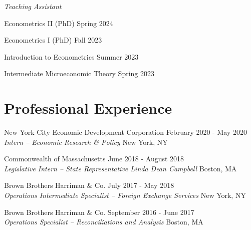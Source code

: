 \documentclass[letterpaper]{article}
\renewenvironment{itemize}{
  \begin{list}{}{
    \setlength{\leftmargin}{1.5em}
  }
}{
  \end{list}
}
\begin{document}
\begin{itemize}

    \item \textit{Teaching Assistant}

    \hspace{10pt} Econometrics II (PhD) \hfill Spring 2024
        
    \hspace{10pt} Econometrics I (PhD) \hfill Fall 2023
    
    \hspace{10pt} Introduction to Econometrics  \hfill Summer 2023
    
    \hspace{10pt} Intermediate Microeconomic Theory  \hfill Spring 2023
    
\end{itemize}



\section*{Professional Experience}

\begin{itemize}

    \item New York City Economic Development Corporation \hfill February 2020 - May 2020 \\
    {\sl Intern -- Economic Research \& Policy} \hfill New York, NY

    \item Commonwealth of Massachusetts \hfill June 2018 - August 2018 \\
    {\sl Legislative Intern -- State Representative Linda Dean Campbell} \hfill Boston, MA

    \item Brown Brothers Harriman \& Co. \hfill July 2017 - May 2018 \\
    {\sl Operations Intermediate Specialist – Foreign Exchange Services} \hfill New York, NY

    \item Brown Brothers Harriman \& Co. \hfill September 2016 - June 2017 \\
    {\sl Operations Specialist – Reconciliations and Analysis} \hfill Boston, MA
\end{itemize}
\end{document}

